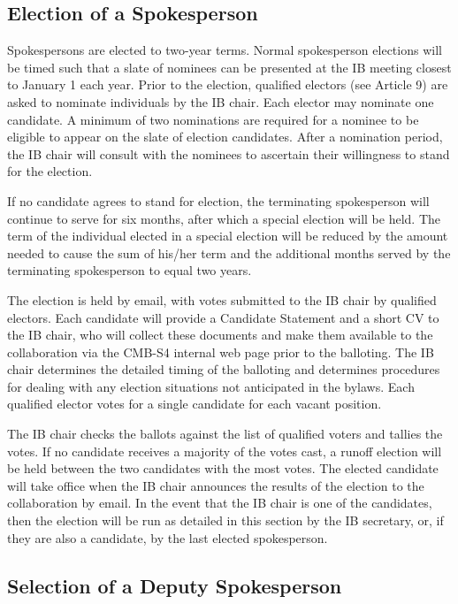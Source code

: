 \documentclass[12pt]{article}
\begin{document}
\subsection{Election of a Spokesperson}

Spokespersons are elected to two-year terms. Normal spokesperson elections will be timed such that a slate of nominees can be presented at the IB meeting closest to January 1 each year. Prior to the election, qualified electors (see Article 9) are asked to nominate individuals by the IB chair. Each elector may nominate one candidate. A minimum of two nominations are required for a nominee to be eligible to appear on the slate of election candidates. After a nomination period, the IB chair will consult with the nominees to ascertain their willingness to stand for the election.

If no candidate agrees to stand for election, the terminating spokesperson will continue to serve for six months, after which a special election will be held. The term of the individual elected in a special election will be reduced by the amount needed to cause the sum of his/her term and the additional months served by the terminating spokesperson to equal two years.

The election is held by email, with votes submitted to the IB chair by qualified electors. Each candidate will provide a Candidate Statement and a short CV to the IB chair, who will collect these documents and make them available to the collaboration via the CMB-S4 internal web page prior to the balloting. The IB chair determines the detailed timing of the balloting and determines procedures for dealing with any election situations not anticipated in the bylaws. Each qualified elector votes for a single candidate for each vacant position.

The IB chair checks the ballots against the list of qualified voters and tallies the votes. If no candidate receives a majority of the votes cast, a runoff election will be held between the two candidates with the most votes. The elected candidate will take office when the IB chair announces the results of the election to the collaboration by email. In the event that the IB chair is one of the candidates, then the election will be run as detailed in this section by the IB secretary, or, if they are also a candidate, by the last elected spokesperson.

\subsection{Selection of a Deputy Spokesperson}
\end{document}
